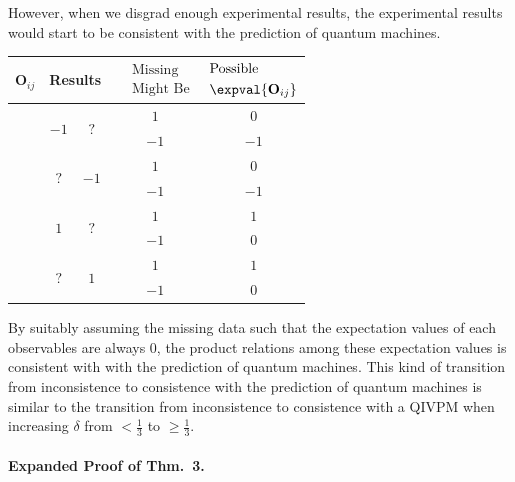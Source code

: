 \documentclass[english,reprint, aps, prl,superscriptaddress, showpacs,
showkeys, longbibliography, amsmath, amssymb, floatfix]{revtex4-1}
\theoremstyle{plain}
\theoremstyle{definition}
\newcommand{\missing}{?}
\begin{document}
\noindent However, when we disgrad enough experimental results, the
experimental results would start to be consistent with the prediction
of quantum machines.
\begin{center}
\begin{tabular}{ccccc}
\toprule 
\addlinespace
$\mathbf{O}_{ij}$  & \multicolumn{2}{c}{Results} & $\begin{aligned} & \textrm{Missing}\\
 & \textrm{Might Be}
\end{aligned}
$  & $\begin{aligned} & \textrm{Possible}\\
 & \expval{\mathbf{O}_{ij}}
\end{aligned}
$\tabularnewline
\midrule
\midrule 
\addlinespace
\multirow{2}{*}{$\mathbf{O}_{00}$, $\mathbf{O}_{11}$} & \multirow{2}{*}{$-1$ } & \multirow{2}{*}{$\missing$} & $1$ & $0$\tabularnewline
\cmidrule{4-5} 
\addlinespace
 &  &  & $-1$ & $-1$\tabularnewline
\midrule 
\addlinespace
\multirow{2}{*}{$\mathbf{O}_{01}$, $\mathbf{O}_{10}$} & \multirow{2}{*}{$\missing$} & \multirow{2}{*}{$-1$ } & $1$ & $0$\tabularnewline
\cmidrule{4-5} 
\addlinespace
 &  &  & $-1$ & $-1$\tabularnewline
\midrule 
\addlinespace
\multirow{2}{*}{$\mathbf{O}_{20}$, $\mathbf{O}_{21}$} & \multirow{2}{*}{$1$ } & \multirow{2}{*}{$\missing$} & $1$ & $1$\tabularnewline
\cmidrule{4-5} 
\addlinespace
 &  &  & $-1$ & $0$\tabularnewline
\midrule 
\addlinespace
\multirow{2}{*}{$\mathbf{O}_{02}$, $\mathbf{O}_{12}$, $\mathbf{O}_{22}$} & \multirow{2}{*}{$\missing$} & \multirow{2}{*}{$1$} & $1$ & $1$\tabularnewline
\cmidrule{4-5} 
\addlinespace
 &  &  & $-1$ & $0$\tabularnewline
\bottomrule
\end{tabular}
\par\end{center}

\noindent By suitably assuming the missing data such that the expectation
values of each observables are always $0$, the product relations
among these expectation values is consistent with with the prediction
of quantum machines. This kind of transition from inconsistence to
consistence with the prediction of quantum machines is similar to
the transition from inconsistence to consistence with a QIVPM when
increasing $\delta$ from $<\tfrac{1}{3}$ to $\ge\tfrac{1}{3}$.

\bigskip 

\paragraph*{Expanded Proof of Thm.~3.}
\end{document}
